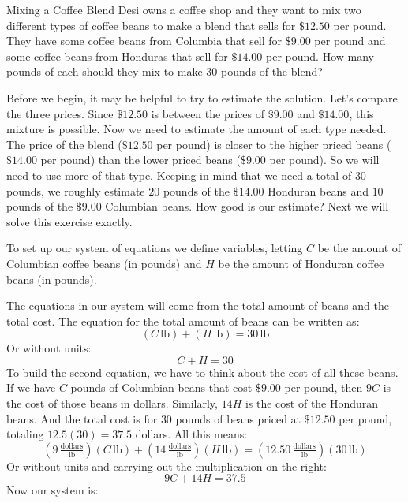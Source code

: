 \documentclass[nooutcomes]{ximera}
\begin{document}
\begin{example}{Mixing a Coffee Blend}
          Desi owns a coffee shop and they want to mix two different types of coffee beans to make a blend that sells for $\$12.50$ per pound.
          They have some coffee beans from Columbia that sell for $\$9.00$ per pound and some coffee beans from Honduras that sell for $\$14.00$ per pound.
          How many pounds of each should they mix to make $30$ pounds of the blend?
\begin{explanation}
          Before we begin, it may be helpful to try to estimate the solution.
          Let's compare the three prices.
          Since $\$12.50$ is between the prices of $\$9.00$ and $\$14.00$,
          this mixture is possible.
          Now we need to estimate the amount of each type needed.
          The price of the blend ($\$12.50$ per pound) is closer to the higher priced beans ($\$14.00$ per pound) than the lower priced beans
          ($\$9.00$ per pound).
          So we will need to use more of that type.
          Keeping in mind that we need a total of $30$ pounds,
          we roughly estimate $20$ pounds of the $\$14.00$ Honduran beans and $10$ pounds of the $\$9.00$ Columbian beans.
          How good is our estimate?
          Next we will solve this exercise exactly.

          To set up our system of equations we define variables,
          letting $C$ be the amount of Columbian coffee beans
          (in pounds)
          and $H$ be the amount of Honduran coffee beans
          (in pounds).

          The equations in our system will come from the total amount of beans and the total cost.
          The equation for the total amount of beans can be written as:
      \[    
            (C\,\text{lb})+(H\,\text{lb})=30\,\text{lb}
   \]     
          Or without units:
         \[
            C+H=30
\]
          To build the second equation,
          we have to think about the cost of all these beans.
          If we have $C$ pounds of Columbian beans that cost $\$9.00$ per pound,
          then $9C$ is the cost of those beans in dollars.
          Similarly, $14H$ is the cost of the Honduran beans.
          And the total cost is for $30$ pounds of beans priced at $\$12.50$ per pound,
          totaling $12.5(30)=37.5$ dollars.
          All this means:
    \[      
            \left(9\,\tfrac{\text{dollars}}{\text{lb}}\right)(C\,\text{lb})+\left(14\,\tfrac{\text{dollars}}{\text{lb}}\right)(H\,\text{lb})=\left(12.50\,\tfrac{\text{dollars}}{\text{lb}}\right)(30\,\text{lb})
 \]
          Or without units and carrying out the multiplication on the right:
     \[
            9C+14H=37.5
\]
          Now our system is:


\end{explanation}
\end{example}
\end{document}
